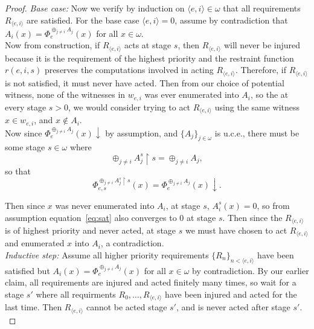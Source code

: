\documentclass{article}
\begin{document}
\begin{enumerate}[label={(\roman*)}]
\begin{proof}
        \textit{Base case:} Now we verify by induction on $\langle
        e,i\rangle\in\omega$ that all requirements $R_{\langle e,i\rangle}$
        are satisfied. For the base case $\langle e,i\rangle=0$, assume by
        contradiction that $A_i(x)=\Phi_e^{\oplus_{j\neq i} A_j}(x)$ for
        all $x\in\omega$. \\

        Now from construction, if $R_{\langle e,i\rangle}$ acts at stage
        $s$, then $R_{\langle e,i\rangle}$ will never be injured
        because it is the requirement of the highest priority and the
        restraint function $r(e,i,s)$ preserves the computations involved
        in acting $R_{\langle e,i\rangle}$. Therefore, if $R_{\langle
        e,i\rangle}$ is not satisfied, it must never have acted.
        Then from our choice of potential witness, none of the witnesses in
        $w_{e,i}$ was ever enumerated into $A_i$, so the at every stage
        $s>0$, we would consider trying to act $R_{\langle e,i\rangle}$
        using the same witness $x\in w_{e,i}$, and $x\not\in A_i$. \\

        Now since $\Phi_e^{\oplus_{j\neq i} A_j}(x)\downarrow$ by
        assumption, and $\{A_j\}_{j\in\omega}$ is u.c.e., there must be
        some stage $s\in\omega$ where
        \[\oplus_{j\neq i} A_j^s \restriction s =\oplus_{j\neq i} A_j,\]
        so that
        \begin{equation}
          \Phi_{e,s}^{\oplus_{j\neq i} A_j^s \restriction s}(x)
          =\Phi_e^{\oplus_{j\neq i} A_j}(x) \downarrow.
          \label{eq:sat}
        \end{equation}

        Then since $x$ was never enumerated into $A_i$, at stage $s$,
        $A_i^s(x)=0$, so from assumption equation~\eqref{eq:sat} also
        converges to 0 at stage $s$. Then since the $R_{\langle
        e,i\rangle}$ is of highest priority and never acted, at
        stage $s$ we must have chosen to act $R_{\langle
        e,i\rangle}$ and enumerated $x$ into $A_i$, a contradiction. \\

        \textit{Inductive step:} Assume all higher priority requirements
        $\{R_n\}_{n <\langle e,i\rangle}$ have been satisfied but
        $A_i(x)=\Phi_e^{\oplus_{j\neq i} A_j}(x)$ for all $x\in\omega$ by
        contradiction. By our earlier claim, all requirements are injured
        and acted finitely many times, so wait for a stage
        $s'$ where all requirments $R_0,\ldots,R_{\langle e,i\rangle}$ have
        been injured and acted for the last time. Then $R_{\langle
        e,i\rangle}$ cannot be acted stage $s'$, and is never
        acted after stage $s'$. \\


\end{proof}
\end{enumerate}
\end{document}
